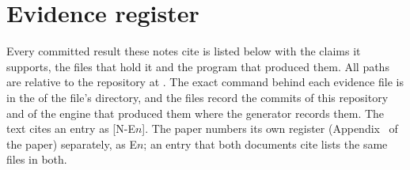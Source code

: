 \section{Evidence register}\label{notes:register}\label{notes:evidence}
Every committed result these notes cite is listed below with the claims it supports, the files that hold it and the program that produced them. All paths are relative to the repository at \repourl. The exact command behind each evidence file is in the  of the file's directory, and the files record the commits of this repository and of the engine that produced them where the generator records them. The text cites an entry as [N-E$n$]. The paper numbers its own register (Appendix~ of the paper) separately, as E$n$; an entry that both documents cite lists the same files in both.

